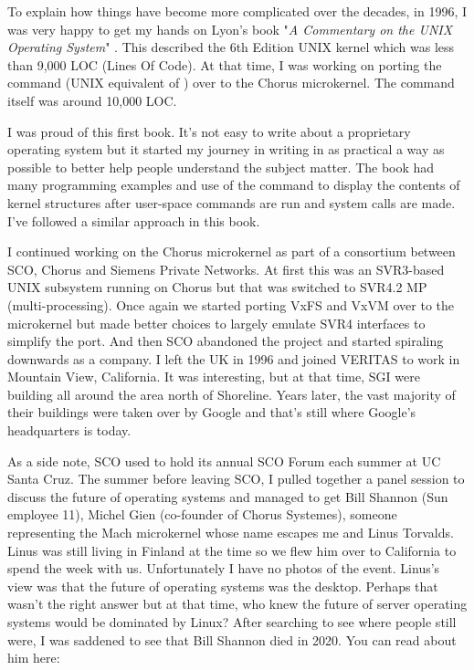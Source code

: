 To explain how things have become more complicated over the decades, in 1996, I was very happy to get my hands on Lyon's book "\textit{A Commentary on the UNIX Operating System}" \cite{lions}. This described the 6th Edition UNIX kernel which was less than 9,000 LOC (Lines Of Code). At that time, I was working on porting the  command (UNIX equivalent of ) over to the Chorus microkernel. The  command itself was around 10,000 LOC.

I was proud of this first book. It’s not easy to write about a proprietary operating system but it started my journey in writing in as practical a way as possible to better help people understand the subject matter. The book had many programming examples and use of the  command to display the contents of kernel structures after user-space commands are run and system calls are made. I've followed a similar approach in this book.

I continued working on the Chorus microkernel as part of a consortium between SCO, Chorus and Siemens Private Networks. At first this was an SVR3-based UNIX subsystem running on Chorus but that was switched to SVR4.2 MP (multi-processing). Once again we started porting VxFS and VxVM over to the microkernel but made better choices to largely emulate SVR4 interfaces to simplify the port. And then SCO abandoned the project and started spiraling downwards as a company. I left the UK in 1996 and joined VERITAS to work in Mountain View, California. It was interesting, but at that time, SGI were building all around the area north of Shoreline. Years later, the vast majority of their buildings were taken over by Google and that's still where Google's headquarters is today.

As a side note, SCO used to hold its annual SCO Forum each summer at UC Santa Cruz. The summer before leaving SCO, I pulled together a panel session to discuss the future of operating systems and managed to get Bill Shannon (Sun employee 11), Michel Gien (co-founder of Chorus Systemes), someone representing the Mach microkernel whose name escapes me and Linus Torvalds. Linus was still living in Finland at the time so we flew him over to California to spend the week with us. Unfortunately I have no photos of the event. Linus's view was that the future of operating systems was the desktop. Perhaps that wasn't the right answer but at that time, who knew the future of server operating systems would be dominated by Linux? After searching to see where people still were, I was saddened to see that Bill Shannon died in 2020. You can read about him here:

